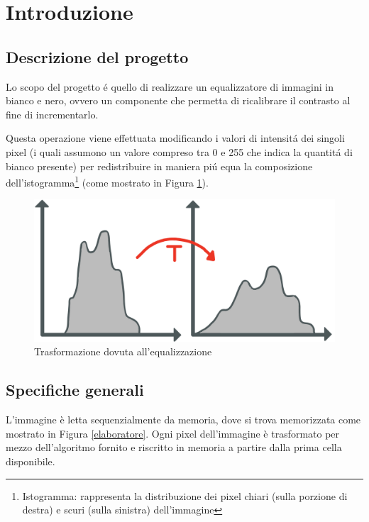 \newpage
\section{Introduzione}
\subsection{Descrizione del progetto}
Lo scopo del progetto é quello di realizzare un equalizzatore di immagini in bianco e nero, ovvero un componente che permetta di ricalibrare il contrasto al fine di incrementarlo.

Questa operazione viene effettuata modificando i valori di intensitá dei singoli pixel (i quali assumono un valore compreso tra 0 e 255 che indica la quantitá di bianco presente) per redistribuire in maniera piú equa la composizione dell'istogramma\footnote{Istogramma: rappresenta la distribuzione dei pixel chiari (sulla porzione di destra) e scuri (sulla sinistra) dell'immagine} (come mostrato in Figura \ref{istogramma}).



\begin{figure}[ht]
    \centering       
    \includegraphics[scale = 0.08]{Figure/istogramma} %
    \caption{Trasformazione dovuta all'equalizzazione}
    \label{istogramma}
\end{figure}

\subsection{Specifiche generali}
L'immagine è letta sequenzialmente da memoria, dove si trova memorizzata come mostrato in Figura \ref{elaboratore}. %
Ogni pixel dell'immagine è trasformato per mezzo dell'algoritmo fornito e riscritto in memoria a partire dalla prima cella disponibile.

